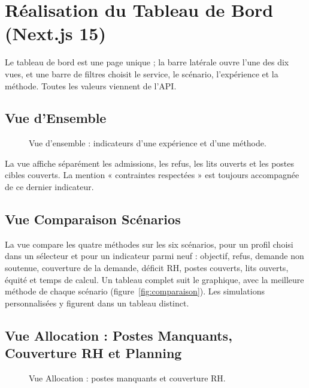\section{Réalisation du Tableau de Bord (Next.js 15)}

Le tableau de bord est une page unique ; la barre latérale ouvre l'une des dix vues, et une barre de filtres choisit le service, le scénario, l'expérience et la méthode. Toutes les valeurs viennent de l'API.

\subsection{Vue d'Ensemble}
\begin{figure}[H]
    \centering
    \caption{Vue d'ensemble : indicateurs d'une expérience et d'une méthode.}
    \label{fig:overview}
\end{figure}

La vue affiche séparément les admissions, les refus, les lits ouverts et les postes cibles couverts. La mention « contraintes respectées » est toujours accompagnée de ce dernier indicateur.

\subsection{Vue Comparaison Scénarios}
La vue compare les quatre méthodes sur les six scénarios, pour un profil choisi dans un sélecteur et pour un indicateur parmi neuf : objectif, refus, demande non soutenue, couverture de la demande, déficit RH, postes couverts, lits ouverts, équité et temps de calcul. Un tableau complet suit le graphique, avec la meilleure méthode de chaque scénario (figure~\ref{fig:comparaison}). Les simulations personnalisées y figurent dans un tableau distinct.

\subsection{Vue Allocation : Postes Manquants, Couverture RH et Planning}
\begin{figure}[H]
    \centering
    \caption{Vue Allocation : postes manquants et couverture RH.}
    \label{fig:allocation_heatmap}
\end{figure}

